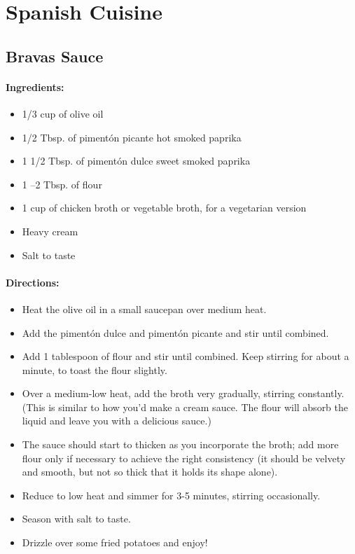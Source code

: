 \documentclass{article}
\begin{document}
\section{Spanish Cuisine}


\subsection{Bravas Sauce}

\paragraph{Ingredients:}
\begin{itemize}
    \item 1/3 cup of olive oil
    \item 1/2 Tbsp. of pimentón picante hot smoked paprika
    \item 1 1/2 Tbsp. of pimentón dulce sweet smoked paprika
    \item 1 –2 Tbsp. of flour
    \item 1 cup of chicken broth or vegetable broth, for a vegetarian version
    \item Heavy cream
    \item Salt to taste
\end{itemize}

\paragraph{Directions:}
\begin{itemize}
    \item Heat the olive oil in a small saucepan over medium heat.
    \item Add the pimentón dulce and pimentón picante and stir until combined.
    \item Add 1 tablespoon of flour and stir until combined. Keep stirring for about a minute, to toast the flour slightly.
    \item Over a medium-low heat, add the broth very gradually, stirring constantly. (This is similar to how you'd make a cream sauce. The flour will absorb the liquid and leave you with a delicious sauce.)
    \item The sauce should start to thicken as you incorporate the broth; add more flour only if necessary to achieve the right consistency (it should be velvety and smooth, but not so thick that it holds its shape alone).
    \item Reduce to low heat and simmer for 3-5 minutes, stirring occasionally.
    \item Season with salt to taste.
    \item Drizzle over some fried potatoes and enjoy!
\end{itemize}
\end{document}
